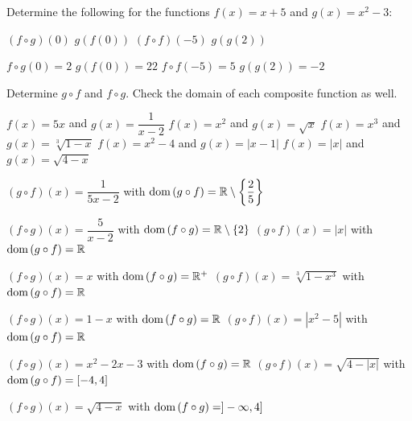 
\begin{Exercise} Determine the following for the functions $f(x) = x+5$ and $g(x) = x^2-3$: 
	\begin{multicols}{2}
		\Question[difficulty = 1] $(f \circ g) (0)$ 
		\Question[difficulty = 1] $g(f(0))$ 
		\Question[difficulty = 1] $(f \circ f) (-5)$
		\Question[difficulty = 1] $g(g(2))$ 
		\EndCurrentQuestion
	\end{multicols}

\end{Exercise}

\begin{Answer}\phantom{}
    \begin{multicols}{2}
		
			\Question $f \circ g (0) = 2$ 
			\Question $g(f(0)) = 22$ 
			\Question $f \circ f (-5) = 5$
			\Question $g(g(2)) = -2$ 
	\EndCurrentQuestion 
	\end{multicols}
\end{Answer}

\begin{Exercise} Determine $g\circ f$ and $f\circ g$. Check the domain of each composite function as well.  
	\begin{multicols}{2}
		\Question[difficulty = 1] $f(x)=5x$ \quad and \quad  $g(x)=\dfrac{1}{x-2}$
		\Question[difficulty = 1] $f(x)=x^2$ \quad and \quad $g(x)=\sqrt{x}$
		\Question[difficulty = 1] $f(x)=x^3$ \quad and \quad  $g(x)=\sqrt[3]{1-x}$
    	\Question[difficulty = 1] $f(x) = x^2-4$ \quad and \quad $g(x) = |x-1|$ 
    	\ifanalysis\Question[difficulty = 1]\fi \ifcalculus\Question[difficulty = 2]\fi $f(x) = |x|$ \quad and \quad $g(x) = \sqrt{4-x}$ 
        \EndCurrentQuestion
	\end{multicols}
\end{Exercise}

\begin{Answer}\phantom{}
    
    	\Question $(g\circ f)(x) = \dfrac{1}{5x-2}$\; with $\text{dom}{\,}  (g\circ f) = \mathbb{R}\setminus \left\{\dfrac{2}{5}\right\} $ 
    	
    	 $(f\circ g)(x) = \dfrac{5}{x-2}$\; with $\text{dom}{\,}  (f\circ g) = \mathbb{R}\setminus \{2\} $ 
    	\Question $(g\circ f)(x) = |x|$ \; with $\text{dom}{\,}  (g\circ f) = \mathbb{R} $ 
    	
    	 $(f\circ g)(x) = x$ \; with $\text{dom}{\,}  (f\circ g) = \mathbb{R}^+ $ 
    	\Question $(g\circ f)(x) = \sqrt[3]{1-x^3}$ \; with $\text{dom}{\,}  (g\circ f) =  \mathbb{R}  $
    	
    	 $(f\circ g)(x) = 1-x$ \; with $\text{dom}{\,}  (f\circ g) = \mathbb{R} $ 
    	\Question $(g\circ f)(x) = |x^2-5|$ \; with $\text{dom}{\,}  (g\circ f) =  \mathbb{R}  $
    	
	     $(f\circ g)(x) = x^2-2x-3$ \; with $\text{dom}{\,}  (f\circ g) = \mathbb{R} $
    	\Question $(g\circ f)(x) = \sqrt{4-|x|}$ \; with $\text{dom}{\,}  (g\circ f) =  [-4,4] $
    	
	     $(f\circ g)(x) =\sqrt{4-x}$ \; with $\text{dom}{\,}  (f\circ g) = ]-\infty, 4] $
	
\end{Answer}

